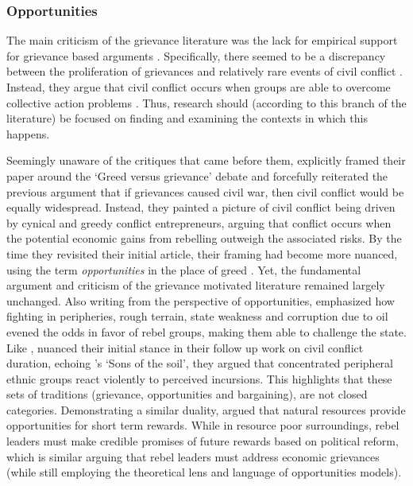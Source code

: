 
\subsubsection{Opportunities} \label{Opportunities}

The main criticism of the grievance literature was the lack for empirical
support for grievance based arguments \citep{Oberschall_1978, Brush_1996}.
Specifically, there seemed to be a discrepancy between the proliferation of
grievances and relatively rare events of civil conflict \citep{Snyder_1972,
TillyCharles1978Fmtr, Skocpol_1979}. Instead, they argue that civil conflict
occurs when groups are able to overcome collective action problems
\citep{Larson_2018}. Thus, research should (according to this branch of the
literature) be focused on finding and examining the contexts in which this
happens.

Seemingly unaware of the critiques that came before them, \citet{Collier2004}
explicitly framed their paper around the `Greed versus grievance' debate and
forcefully reiterated the previous argument that if grievances caused civil war,
then civil conflict would be equally widespread. Instead, they painted a picture
of civil conflict being driven by cynical and greedy conflict entrepreneurs,
arguing that conflict occurs when the potential economic gains from rebelling
outweigh the associated risks. By the time they revisited their
initial article, their framing had become more nuanced, using the term
\textit{opportunities} in the place of greed \citep{Collier2009}. Yet, the
fundamental argument and criticism of the grievance motivated literature
remained largely unchanged. Also writing from the perspective of opportunities,
\citet{Fearon2003} emphasized how fighting in peripheries, rough terrain, state
weakness and corruption due to oil evened the odds in favor of rebel groups,
making them able to challenge the state. Like \citet{Collier2009},
\citet{Fearon_2004} nuanced their initial stance in their follow up work on
civil conflict duration, echoing \citet{WeinerMyron1978SotS}'s `Sons of the soil',
they argued that concentrated peripheral ethnic groups react violently to
perceived incursions. This highlights that these sets of traditions (grievance,
opportunities and bargaining), are not closed categories. Demonstrating a
similar duality, \citet{Weinstein_2005} argued that natural resources provide
opportunities for short term rewards. While in resource poor surroundings, rebel
leaders must make credible promises of future rewards based on political reform,
which is similar arguing that rebel leaders must address economic grievances
(while still employing the theoretical lens and language of opportunities
models).

